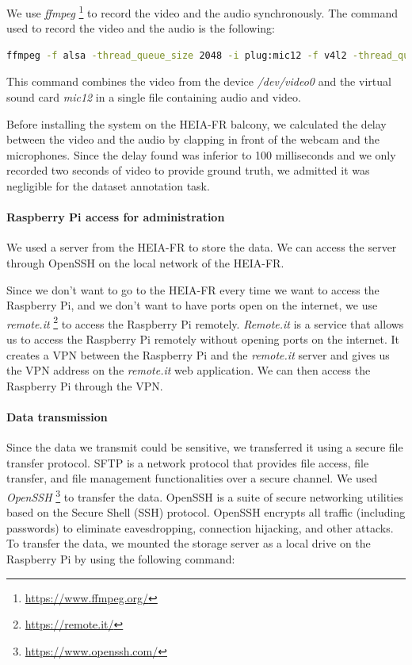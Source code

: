 We use \textit{ffmpeg} \footnote{\url{https://www.ffmpeg.org/}} to record the video and the audio synchronously. The command used to record the video and the audio is the following:

\begin{lstlisting}[language=bash]
    ffmpeg -f alsa -thread_queue_size 2048 -i plug:mic12 -f v4l2 -thread_queue_size 2048 -input_format mjpeg -video_size 600x400 -i /dev/video0 -c:a aac -map 0:a -map 1:v -segment_time 00:10:00 -f segment /mnt/videos/$current_date/output%05d.mp4
\end{lstlisting}

This command combines the video from the device \textit{/dev/video0} and the virtual sound card \textit{mic12} in a single file containing audio and video.

Before installing the system on the HEIA-FR balcony, we calculated the delay between the video and the audio by clapping in front of the webcam and the microphones. Since the delay found was inferior to 100 milliseconds and we only recorded two seconds of video to provide ground truth, we admitted it was negligible for the dataset annotation task.

\paragraph{Raspberry Pi access for administration}

We used a server from the HEIA-FR to store the data. We can access the server through OpenSSH on the local network of the HEIA-FR.

Since we don't want to go to the HEIA-FR every time we want to access the Raspberry Pi, and we don't want to have ports open on the internet, we use \textit{remote.it} \footnote{\url{https://remote.it/}} to access the Raspberry Pi remotely. \textit{Remote.it} is a service that allows us to access the Raspberry Pi remotely without opening ports on the internet. It creates a VPN between the Raspberry Pi and the \textit{remote.it} server and gives us the VPN address on the \textit{remote.it} web application. We can then access the Raspberry Pi through the VPN.


\paragraph{Data transmission}

Since the data we transmit could be sensitive, we transferred it using a secure file transfer protocol. SFTP is a network protocol that provides file access, file transfer, and file management functionalities over a secure channel. We used \textit{OpenSSH} \footnote{\url{https://www.openssh.com/}} to transfer the data. OpenSSH is a suite of secure networking utilities based on the Secure Shell (SSH) protocol. OpenSSH encrypts all traffic (including passwords) to eliminate eavesdropping, connection hijacking, and other attacks. To transfer the data, we mounted the storage server as a local drive on the Raspberry Pi by using the following command:

